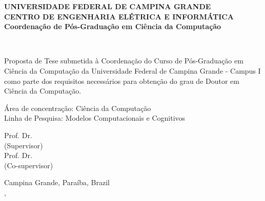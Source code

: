 \begin{center}
\textbf{UNIVERSIDADE FEDERAL DE CAMPINA GRANDE} \\
\textbf{CENTRO DE ENGENHARIA ELÉTRICA E INFORMÁTICA} \\
\textbf{Coordenação de Pós-Graduação em Ciência da Computação}
\vspace{3em}

\Large{}
\thetitle
\vspace{3em}

\Large{\theauthor}\\
\vspace{3em}

\normalsize
\begin{flushright}
\parbox[t]{122mm}{Proposta de Tese submetida à Coordenação do Curso de Pós-Graduação em Ciência da Computação da Universidade Federal de Campina Grande - Campus I como parte dos requisitos necessários para obtenção do grau de Doutor em Ciência da Computação.}
\end{flushright}
\vspace{3em}

\begin{flushleft}
Área de concentração: Ciência da Computação\\
Linha de Pesquisa: Modelos Computacionais e Cognitivos
\vspace{3em}
\end{flushleft}

Prof. Dr. \profa\\
(Supervisor) \\
\vspace{1em}
Prof. Dr. \profb\\
(Co-supervisor)
\vfill

Campina Grande, Paraíba, Brazil \\
\MONTH, \the\year
\end{center}
